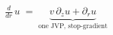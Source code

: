 \documentclass[border=10pt,varwidth=\maxdimen]{standalone}
\begin{document}
\(\displaystyle \frac{d}{dr}\, u \;=\; \underbrace{v\,\partial_z u + \partial_r u}_{\text{one JVP, stop-gradient}} \)
\end{document}
